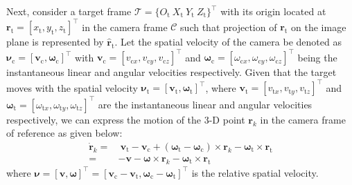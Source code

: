 \documentclass[lettersize,journal]{IEEEtran}
\begin{document}
Next, consider a target frame $\mathcal{T}=\{O_{\text{t}} ~X_{\text{t}} ~Y_{\text{t}} ~Z_{\text{t}}\}^{\top}$ with its origin located at $\boldsymbol{r}_{\text{t}} = [x_{\text{t}}, y_{\text{t}}, z_{\text{t}}]^{\top}$ in the camera frame $\mathcal{C}$ such that projection of $\boldsymbol{r}_{\text{t}}$ on the image plane is represented by $\boldsymbol{\hat{r}}_{\text{t}}$.
Let the spatial velocity of the camera be denoted as $\boldsymbol{\nu}_{\text{c}} = [\boldsymbol{v}_{\text{c}}, \boldsymbol{\omega}_{\text{c}}]^{\top}$ with $\boldsymbol{v}_{\text{c}} = [v_{\text{c}x}, v_{\text{c}y}, v_{\text{c}z}]^{\top}$ and $\boldsymbol{\omega}_{\text{c}} = [\omega_{\text{c}x}, \omega_{\text{c}y}, \omega_{\text{c}z}]^{\top}$ being the instantaneous linear and angular velocities respectively.
Given that the target moves with the spatial velocity $\boldsymbol{\nu}_{\text{t}} = [\boldsymbol{v}_{\text{t}}, \boldsymbol{\omega}_{\text{t}}]^{\top}$, where $\boldsymbol{v}_{\text{t}} = [v_{\text{t}x}, v_{\text{t}y}, v_{\text{t}z}]^{\top}$ and $\boldsymbol{\omega}_{\text{t}} = [\omega_{\text{t}x}, \omega_{\text{t}y}, \omega_{\text{t}z}]^{\top}$ are the instantaneous linear and angular velocities respectively, we can express the motion of the 3-D point $\boldsymbol{r}_k$ in the camera frame of reference as given below:
\begin{align} \label{Eq. (A6)}
    \dot{\boldsymbol{r}}_k =& ~\boldsymbol{v}_{\text{t}} - \boldsymbol{v}_{\text{c}} + (\boldsymbol{\omega}_{\text{t}} - \boldsymbol{\omega}_{\text{c}}) \times \boldsymbol{r}_k - \boldsymbol{\omega}_{\text{t}} \times \boldsymbol{r}_{\text{t}} \nonumber \\
    =& - \boldsymbol{v} - \boldsymbol{\omega} \times \boldsymbol{r}_{k} - \boldsymbol{\omega}_{\text{t}} \times \boldsymbol{r}_{\text{t}}
\end{align}
where $\boldsymbol{\nu} = [\boldsymbol{v}, \boldsymbol{\omega}]^{\top} = [\boldsymbol{v}_{\text{c}} - \boldsymbol{v}_{\text{t}}, \boldsymbol{\omega}_{\text{c}} - \boldsymbol{\omega}_{\text{t}}]^{\top}$ is the relative spatial velocity.
\end{document}
